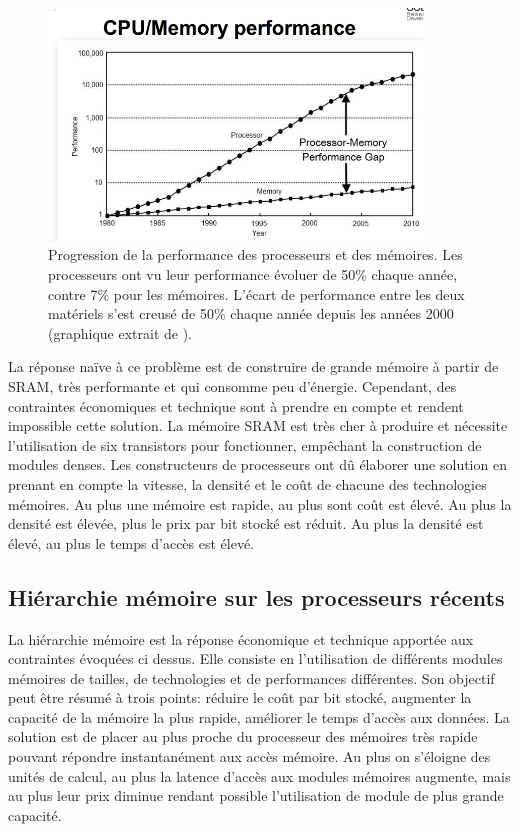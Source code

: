 \begin{figure}
    \center
    \includegraphics[width=10cm]{images/cpu_vs_memory.png}
    \caption{\label{pic:cpuvsmemory} Progression de la performance des processeurs et des mémoires. Les processeurs ont vu leur performance évoluer de 50\% chaque année, contre 7\% pour les mémoires. L'écart de performance entre les deux matériels s'est creusé de 50\%  chaque année depuis les années 2000 (graphique extrait de \cite{AliSalehi2012}).}
\end{figure}

La réponse naïve à ce problème est de construire de grande mémoire à partir de SRAM, très performante et qui consomme peu d'énergie. Cependant, des contraintes économiques et technique sont à prendre en compte et rendent impossible cette solution. La mémoire SRAM est très cher à produire et nécessite l'utilisation de six transistors pour fonctionner, empêchant la construction de modules denses. Les constructeurs de processeurs ont dû élaborer une solution en prenant en compte la vitesse, la densité et le coût de chacune des technologies mémoires. Au plus une mémoire est rapide, au plus sont coût est élevé. Au plus la densité est élevée, plus le prix par bit stocké est réduit. Au plus la densité est élevé, au plus le temps d'accès est élevé. 






\subsection{Hiérarchie mémoire sur les processeurs récents}

La hiérarchie mémoire est la réponse économique et technique apportée aux contraintes évoquées ci dessus. Elle consiste en l'utilisation de différents modules mémoires de tailles, de technologies et de performances différentes. Son objectif peut être résumé à trois points: réduire le coût par bit stocké, augmenter la capacité de la mémoire la plus rapide, améliorer le temps d'accès aux données. La solution est de placer au plus proche du processeur des mémoires très rapide pouvant répondre instantanément aux accès mémoire. Au plus on s'éloigne des unités de calcul, au plus la latence d'accès aux modules mémoires augmente, mais au plus leur prix diminue rendant possible l'utilisation de module de plus grande capacité.


